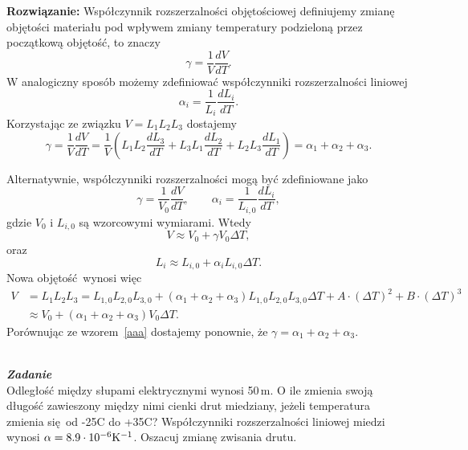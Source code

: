 \documentclass[11pt,a4paper]{article}
\newcounter{zadanie}\newcommand{\zadanie}[1][]{\addtocounter{zadanie}{1} ~\\  {\bf \emph{Zadanie \arabic{zadanie} #1 }} \\}
\begin{document}
\vskip 10pt

\textbf{Rozwiązanie:} Współczynnik rozszerzalności objętościowej definiujemy zmianę objętości materiału pod wpływem zmiany temperatury podzieloną przez początkową objętość, to znaczy
\begin{equation}
	\gamma = \frac{1}{V} \frac{dV}{dT}.
\end{equation}
W analogiczny sposób możemy zdefiniować współczynniki rozszerzalności liniowej
\begin{equation}
	\alpha_i = \frac{1}{L_i} \frac{d L_i }{dT}.
\end{equation}
Korzystając ze związku $V = L_1 L_2 L_3$ dostajemy
\begin{equation}
	\gamma = \frac{1}{V} \frac{dV}{dT} = \frac{1}{V} \left( L_1 L_2 \frac{d L_3}{dT} + L_3 L_1 \frac{d L_2}{dT} + L_2 L_3 \frac{d L_1}{dT} \right) = \alpha_1 + \alpha_2 + \alpha_3.
\end{equation}

Alternatywnie, współczynniki rozszerzalności mogą być zdefiniowane jako
\begin{equation}
	\gamma = \frac{1}{V_{0}} \frac{dV}{dT}, \qquad \alpha_i = \frac{1}{L_{i, 0}} \frac{d L_i }{dT},
\end{equation} 
gdzie $V_{0}$ i $L_{i, 0}$ są wzorcowymi wymiarami. Wtedy
\begin{equation}
	V \approx V_{0} + \gamma V_{0} \Delta T, \label{aaa}
\end{equation}
oraz 
\begin{equation}
	L_{i} \approx L_{i, 0} + \alpha_{i} L_{i, 0} \Delta T.
\end{equation}
Nowa objętość wynosi więc
\begin{align}
	V &= L_{1} L_{2} L_{3} = L_{1,0} L_{2, 0} L_{3, 0} + (\alpha_{1} + \alpha_{2} + \alpha_{3}) L_{1,0} L_{2, 0} L_{3, 0} \Delta T + A \cdot (\Delta T)^{2} + B \cdot (\Delta T)^{3} \nonumber \\
	&\approx  V_{0} + (\alpha_{1} + \alpha_{2} + \alpha_{3}) V_{0} \Delta T.
\end{align}
Porównując ze wzorem~\eqref{aaa} dostajemy ponownie, że $\gamma = \alpha_{1} + \alpha_{2} + \alpha_{3}$.

\zadanie
Odległość między słupami elektrycznymi wynosi 50\,m.
O ile zmienia swoją długość zawieszony między nimi cienki drut miedziany,
jeżeli temperatura zmienia się od -25\degree C do +35\degree C?
Współczynniki rozszerzalności liniowej miedzi wynosi $\alpha = 8.9\cdot 10^{-6} {\rm K}^{-1}$.
Oszacuj zmianę zwisania drutu.
\end{document}
